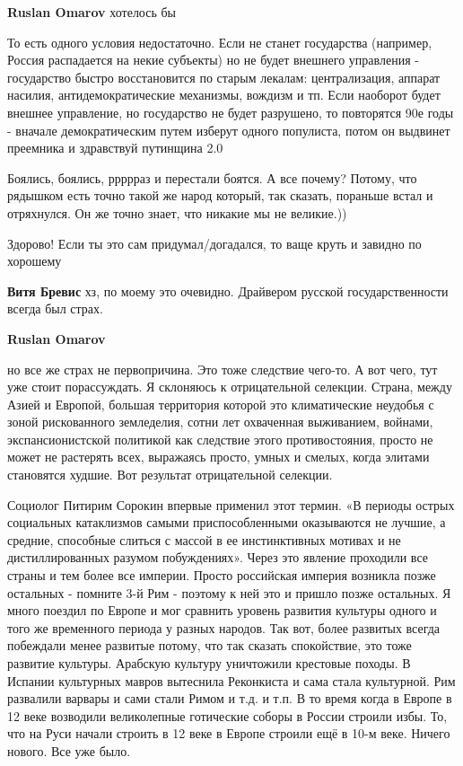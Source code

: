 \begin{itemize}
\begin{itemize}
\textbf{Ruslan Omarov} хотелось бы


То есть одного условия недостаточно. Если не станет государства (например,
Россия распадается на некие субъекты) но не будет внешнего управления -
государство быстро восстановится по старым лекалам: централизация, аппарат
насилия, антидемократические механизмы, вождизм и тп. Если наоборот будет
внешнее управление, но государство не будет разрушено, то повторятся 90е годы -
вначале демократическим путем изберут одного популиста, потом он выдвинет
преемника и здравствуй путинщина 2.0

\end{itemize} %


Боялись, боялись, ррррраз и перестали боятся. А все почему? Потому, что
рядышком есть точно такой же народ который, так сказать, пораньше встал и
отряхнулся. Он же точно знает, что никакие мы не великие.))

Здорово! Если ты это сам придумал/догадался, то ваще круть и завидно по хорошему

\begin{itemize} %
\textbf{Витя Бревис} хз, по моему это очевидно. Драйвером русской государственности всегда был страх.

\textbf{Ruslan Omarov} 

но все же страх не первопричина. Это тоже следствие чего-то. А вот чего, тут
уже стоит порассуждать. Я склоняюсь к отрицательной селекции. Страна, между
Азией и Европой, большая территория которой это климатические неудобья с зоной
рискованного земледелия, сотни лет охваченная выживанием, войнами,
экспансионистской политикой как следствие этого противостояния, просто не может
не растерять всех, выражаясь просто, умных и смелых, когда элитами становятся
худшие. Вот результат отрицательной селекции.

Социолог Питирим Сорокин впервые применил этот термин. «В периоды острых
социальных катаклизмов самыми приспособленными оказываются не лучшие, а
средние, способные слиться с массой в ее инстинктивных мотивах и не
дистиллированных разумом побуждениях». Через это явление проходили все страны и
тем более все империи. Просто российская империя возникла позже остальных -
помните 3-й Рим - поэтому к ней это и пришло позже остальных. Я много поездил
по Европе и мог сравнить уровень развития культуры одного и того же временного
периода у разных народов. Так вот, более развитых всегда побеждали менее
развитые потому, что так сказать спокойствие, это тоже развитие культуры.
Арабскую культуру уничтожили крестовые походы. В Испании культурных мавров
вытеснила Реконкиста и сама стала культурной. Рим развалили варвары и сами
стали Римом и т.д. и т.п. В то время когда в Европе в 12 веке возводили
великолепные готические соборы в России строили избы. То, что на Руси начали
строить в 12 веке в Европе строили ещё в 10-м веке. Ничего нового. Все уже
было.


\end{itemize}
\end{itemize}
